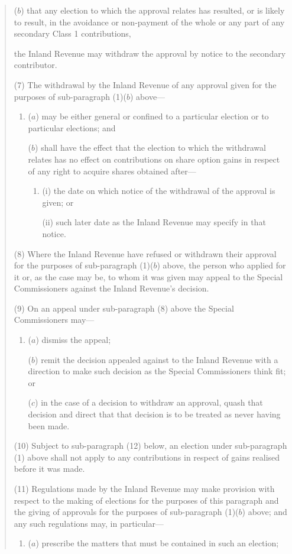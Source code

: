\documentclass[12pt,a4paper]{article}
\begin{document}
\begin{quotation}
\begin{enumerate}
($b$) that any election to which the approval relates has resulted, or is likely to result, in the avoidance or non-payment of the whole or any part of any secondary Class 1 contributions,
\end{enumerate}
the Inland Revenue may withdraw the approval by notice to the secondary contributor.

(7) The withdrawal by the Inland Revenue of any approval given for the purposes of sub-paragraph (1)($b$)  above—
\begin{enumerate}\item[]
($a$) may be either general or confined to a particular election or to particular elections; and

($b$) shall have the effect that the election to which the withdrawal relates has no effect on contributions on share option gains in respect of any right to acquire shares obtained after—
\begin{enumerate}\item[]
(i) the date on which notice of the withdrawal of the approval is given; or

(ii) such later date as the Inland Revenue may specify in that notice.
\end{enumerate}
\end{enumerate}

(8) Where the Inland Revenue have refused or withdrawn their approval for the purposes of sub-paragraph (1)($b$)  above, the person who applied for it or, as the case may be, to whom it was given may appeal to the Special Commissioners against the Inland Revenue’s decision.

(9) On an appeal under sub-paragraph (8)  above the Special Commissioners may—
\begin{enumerate}\item[]
($a$) dismiss the appeal;

($b$) remit the decision appealed against to the Inland Revenue with a direction to make such decision as the Special Commissioners think fit; or

($c$) in the case of a decision to withdraw an approval, quash that decision and direct that that decision is to be treated as never having been made.
\end{enumerate}

(10) Subject to sub-paragraph (12)  below, an election under sub-paragraph (1)  above shall not apply to any contributions in respect of gains realised before it was made.

(11) Regulations made by the Inland Revenue may make provision with respect to the making of elections for the purposes of this paragraph and the giving of approvals for the purposes of sub-paragraph (1)($b$)  above; and any such regulations may, in particular—
\begin{enumerate}\item[]
($a$) prescribe the matters that must be contained in such an election;


\end{enumerate}
\end{quotation}
\end{document}
